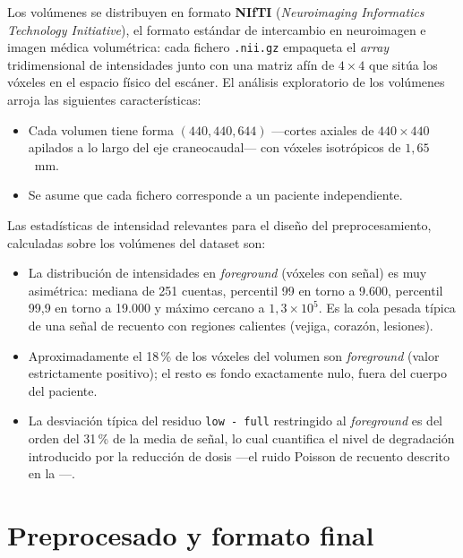 Los volúmenes se distribuyen en formato \textbf{NIfTI}
(\textit{Neuroimaging Informatics Technology Initiative}), el formato
estándar de intercambio en neuroimagen e imagen médica volumétrica:
cada fichero \texttt{.nii.gz} empaqueta el \textit{array}
tridimensional de intensidades junto con una matriz afín de
$4 \times 4$ que sitúa los vóxeles en el espacio físico del escáner.
El análisis exploratorio de los volúmenes arroja las siguientes
características:

\begin{itemize}[leftmargin=*]
    \item Cada volumen tiene forma $(440, 440, 644)$ —cortes axiales
    de $440 \times 440$ apilados a lo largo del eje craneocaudal—
    con vóxeles isotrópicos de $1{,}65$~mm.
    \item Se asume que cada fichero corresponde a un paciente
    independiente.
\end{itemize}

Las estadísticas de intensidad relevantes para el diseño del
preprocesamiento, calculadas sobre los volúmenes del dataset son:

\begin{itemize}[leftmargin=*]
    \item La distribución de intensidades en \textit{foreground}
    (vóxeles con señal) es muy asimétrica: mediana de 251 cuentas,
    percentil 99 en torno a 9.600, percentil 99,9 en torno a 19.000
    y máximo cercano a $1{,}3 \times 10^{5}$. Es la cola pesada
    típica de una señal de recuento con regiones calientes (vejiga,
    corazón, lesiones).
    \item Aproximadamente el 18\,\% de los vóxeles del volumen son
    \textit{foreground} (valor estrictamente positivo); el resto es
    fondo exactamente nulo, fuera del cuerpo del paciente.
    \item La desviación típica del residuo \texttt{low\,-\,full}
    restringido al \textit{foreground} es del orden del 31\,\% de la
    media de señal, lo cual cuantifica el nivel de degradación
    introducido por la reducción de dosis —el ruido Poisson de
    recuento descrito en la —.
\end{itemize}

\section{Preprocesado y formato final}
\label{sec:pet-preprocesado}

